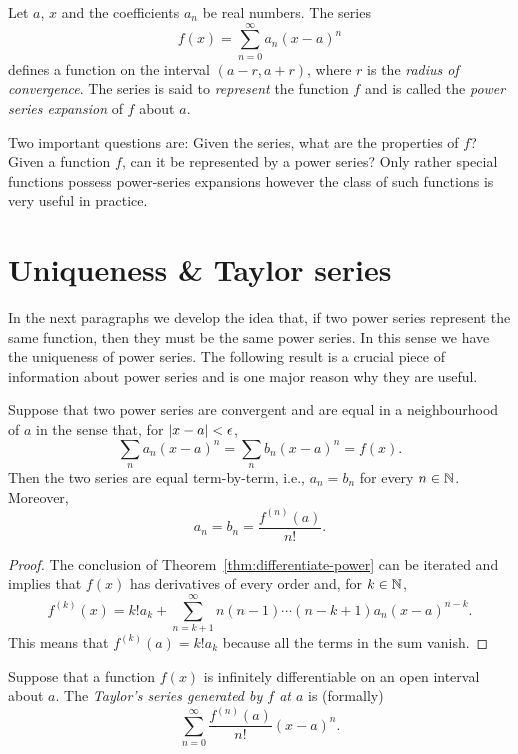 Let \(a\), \(x\) and the coefficients \(a_n\) be real numbers.
The series
\[
  f(x) = \sum_{n=0}^{\infty} a_n {(x-a)}^n
\]
defines a function on the interval \((a-r,a+r)\),
where  \(r\)  is the \emph{radius of convergence}.
%
The series is said to \emph{represent} the function \(f\)
and is called the \emph{power series expansion} of \(f\) about \(a\).

Two important questions are: Given the series, what are the properties of \(f\)?
Given a function \(f\), can it be represented by a power series?
Only rather special functions possess power-series expansions however the class of such functions is very useful in practice.



\section{Uniqueness \& Taylor series}

In the next paragraphs we develop the idea that, if two power series represent the same function, then they must be the same power series.
In this sense we have the uniqueness of power series.
The following result is a crucial piece of information about power series and is one major reason why they are useful.

\begin{theorem}%
  \label{thm:unique-power}
  Suppose that two power series are convergent and are equal in a neighbourhood of \(a\)
  in the sense that, for \(\left|x-a\right| < \epsilon\),
  \[
    \sum_n a_n {(x-a)}^n = \sum_n b_n {(x-a)}^n = f(x).
  \]
  Then the two series are equal term-by-term, i.e.,
  \(a_n = b_n\) for every \(n\in \mathbb{N}\).
  Moreover, 
  \[
    a_n = b_n =  \frac{f^{(n)}(a)}{n!}.
  \]
\end{theorem}

\begin{proof}
  The conclusion of Theorem~\ref{thm:differentiate-power} can be iterated and implies that \(f(x)\) has derivatives of every order and, for \(k\in \mathbb{N}\),
  \[
    f^{(k)}(x) = k! a_k +  \sum_{n=k+1}^{\infty} n(n-1)\cdots (n-k+1) a_n{(x-a)}^{n-k}.
  \]
  This means that \(f^{(k)}(a) = k! a_k \) because all the terms in the sum vanish.
\end{proof}

\begin{definition}%
  \label{def:taylor}
  Suppose that a function \(f(x)\) is infinitely differentiable on an open interval about \(a\).
  The \emph{Taylor's series generated by \(f\) at \(a\)} is (formally)
  \[
    \sum_{n=0}^{\infty} \frac{f^{(n)}(a)}{n!} {(x-a)}^{n}.
  \]
\end{definition}

